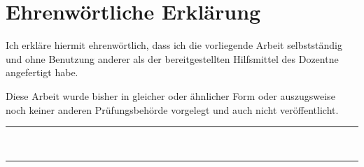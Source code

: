\section*{Ehrenwörtliche Erklärung}

Ich erkläre hiermit ehrenwörtlich, dass ich die vorliegende Arbeit selbstständig
und ohne Benutzung anderer als der bereitgestellten Hilfsmittel des Dozentne angefertigt habe.

Diese Arbeit wurde bisher in gleicher oder ähnlicher Form oder auszugsweise noch
keiner anderen Prüfungsbehörde vorgelegt und auch nicht veröffentlicht.

\vspace{1cm}

\parbox{4cm}{%
    \rule{4cm}{1pt}\\
}\hfill
\parbox{5cm}{%
    \rule{5cm}{1pt}\\
}